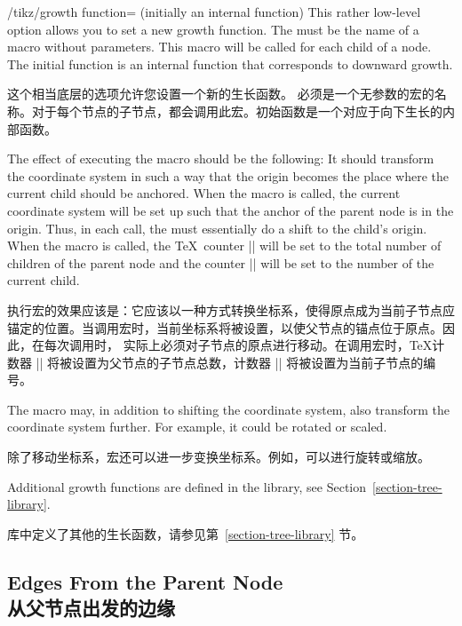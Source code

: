 \begin{key}{/tikz/growth function= (initially \normalfont an internal function)}
    This rather low-level option allows you to set a new growth function. The
     must be the name of a macro without parameters. This
    macro will be called for each child of a node. The initial function is an
    internal function that corresponds to downward growth.

    这个相当底层的选项允许您设置一个新的生长函数。  必须是一个无参数的宏的名称。对于每个节点的子节点，都会调用此宏。初始函数是一个对应于向下生长的内部函数。

    The effect of executing the macro should be the following: It should
    transform the coordinate system in such a way that the origin becomes the
    place where the current child should be anchored. When the macro is called,
    the current coordinate system will be set up such that the anchor of the
    parent node is in the origin. Thus, in each call, the 
    must essentially do a shift to the child's origin. When the macro is
    called, the \TeX\ counter |\tikznumberofchildren| will be set to the total
    number of children of the parent node and the counter
    |\tikznumberofcurrentchild| will be set to the number of the current child.

    执行宏的效果应该是：它应该以一种方式转换坐标系，使得原点成为当前子节点应锚定的位置。当调用宏时，当前坐标系将被设置，以使父节点的锚点位于原点。因此，在每次调用时， 实际上必须对子节点的原点进行移动。在调用宏时，\TeX 计数器 |\tikznumberofchildren| 将被设置为父节点的子节点总数，计数器 |\tikznumberofcurrentchild| 将被设置为当前子节点的编号。

    The macro may, in addition to shifting the coordinate system, also
    transform the coordinate system further. For example, it could be rotated
    or scaled.

    除了移动坐标系，宏还可以进一步变换坐标系。例如，可以进行旋转或缩放。

    Additional growth functions are defined in the library, see
    Section~\ref{section-tree-library}.

    库中定义了其他的生长函数，请参见第~\ref{section-tree-library} 节。

  \end{key}


\subsection{Edges From the Parent Node\\从父节点出发的边缘}
\label{section-edge-from-parent}

